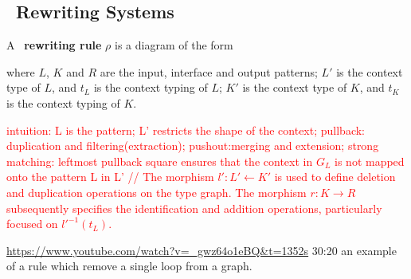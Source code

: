 \documentclass{book}
\begin{document}
    \subsection{\pbpop~Rewriting Systems}
    \begin{definition}
      \label{def:pbpop:rule}
      A \pbpop~\textbf{rewriting rule} \(\rho\) is a diagram of the form
    \begin{center}
    
    \end{center}
    
    \noindent 
    where \(L\), \(K\) and \(R\) are the input, interface and output patterns; \(L'\) is the context type of $L$, and \(t_L\) is the context typing of $L$; \(K'\) is the context type of $K$, and \(t_K\) is the context typing of $K$. 
    \end{definition} 
    \textcolor{red}{intuition:
    L is the pattern; L' restricts the shape of the context; pullback: duplication and filtering(extraction); pushout:merging and extension; strong matching: leftmost pullback square ensures that the context in $G_L$ is not mapped onto the pattern L in L'
    //
    The morphism \(l' : L' \mathop{\leftarrow} K'\) is used to define deletion and duplication operations on the type graph. The morphism \(r : K \mathop{\to} R\) subsequently specifies the identification and addition operations, particularly focused on \(l'^{-1}(t_L)\).
    }
    \begin{example}
        \url{https://www.youtube.com/watch?v=_gwz64o1eBQ&t=1352s} 30:20 an example of a rule which remove a single loop from a graph.
    \end{example}
\end{document}
